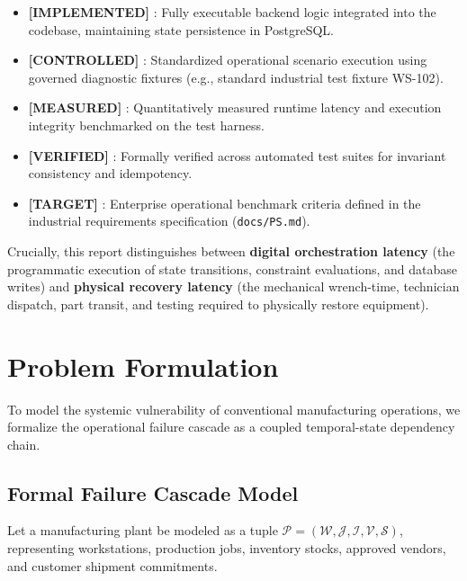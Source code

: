 \documentclass[10pt,twocolumn,a4paper]{article}
\newcommand{\claimtag}[1]{%
    \textsf{\textbf{\scriptsize\color{deepslate}[#1]}}%
}
\begin{document}
\begin{itemize}
    \item \claimtag{IMPLEMENTED}: Fully executable backend logic integrated into the codebase, maintaining state persistence in PostgreSQL.
    \item \claimtag{CONTROLLED}: Standardized operational scenario execution using governed diagnostic fixtures (e.g., standard industrial test fixture WS-102).
    \item \claimtag{MEASURED}: Quantitatively measured runtime latency and execution integrity benchmarked on the test harness.
    \item \claimtag{VERIFIED}: Formally verified across automated test suites for invariant consistency and idempotency.
    \item \claimtag{TARGET}: Enterprise operational benchmark criteria defined in the industrial requirements specification (\texttt{docs/PS.md}).
\end{itemize}

Crucially, this report distinguishes between \textbf{digital orchestration latency} (the programmatic execution of state transitions, constraint evaluations, and database writes) and \textbf{physical recovery latency} (the mechanical wrench-time, technician dispatch, part transit, and testing required to physically restore equipment).

\section{Problem Formulation}
\label{sec:problem_formulation}
To model the systemic vulnerability of conventional manufacturing operations, we formalize the operational failure cascade as a coupled temporal-state dependency chain.

\subsection{Formal Failure Cascade Model}
Let a manufacturing plant be modeled as a tuple $\mathcal{P} = (\mathcal{W}, \mathcal{J}, \mathcal{I}, \mathcal{V}, \mathcal{S})$, representing workstations, production jobs, inventory stocks, approved vendors, and customer shipment commitments. 
\end{document}
